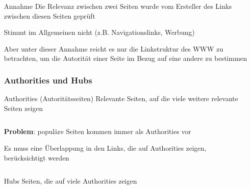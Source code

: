 \documentclass[hyperref={pdfpagelabels=false}]{beamer}
\begin{document}
\begin{frame}[allowframebreaks]

\begin{block}{Annahme}
Die Relevanz zwischen zwei Seiten wurde vom Ersteller des Links zwischen diesen Seiten geprüft
\end{block}

Stimmt im Allgemeinen nicht (z.B. Navigationslinks, Werbung)
\vspace{10pt}

Aber unter dieser Annahme reicht es nur die Linkstruktur des WWW zu betrachten, um die Autorität einer Seite im Bezug auf eine andere zu bestimmen

\frametitle{Authorities und Hubs}

\framebreak

\begin{block}{Authorities (Autoritätsseiten)}
Relevante Seiten, auf die viele weitere relevante Seiten zeigen
\end{block}

\vspace{5pt}
\begin{minipage}[0.2\textheight]{\textwidth}
	\begin{columns}[T]
		\begin{column}{0.7\textwidth}
			{\bf Problem}: populäre Seiten kommen immer als Authorities vor
			
			\vspace{10pt}
			Es muss eine Überlappung in den Links, die auf Authorities zeigen, berücksichtigt werden
		\end{column}
		\begin{column}{0.2\textwidth}
			\begin{figure}
			\end{figure}
		\end{column}
	\end{columns}
\end{minipage}

\begin{block}{Hubs}
Seiten, die auf viele Authorities zeigen
\end{block}

\end{frame}
\end{document}
